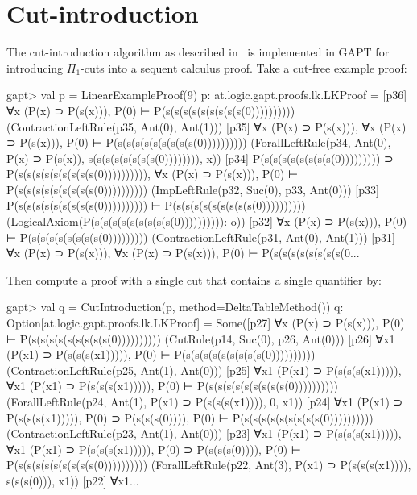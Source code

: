 \documentclass[a4paper,11pt]{book}
\begin{document}
\section{Cut-introduction}\label{sec.cut-introduction}

The cut-introduction algorithm as described in~\cite{Hetzl2012,Hetzl14Algorithmic,Hetzl14Introducing} is
implemented in GAPT for introducing $\Pi_1$-cuts into a sequent calculus
proof. Take a cut-free example proof:
\begin{clilisting}
gapt> val p = LinearExampleProof(9)
p: at.logic.gapt.proofs.lk.LKProof =
[p36] ∀x (P(x) ⊃ P(s(x))), P(0) ⊢ P(s(s(s(s(s(s(s(s(s(0))))))))))    (ContractionLeftRule(p35, Ant(0), Ant(1)))
[p35] ∀x (P(x) ⊃ P(s(x))), ∀x (P(x) ⊃ P(s(x))), P(0) ⊢ P(s(s(s(s(s(s(s(s(s(0))))))))))    (ForallLeftRule(p34, Ant(0), P(x) ⊃ P(s(x)), s(s(s(s(s(s(s(s(0)))))))), x))
[p34] P(s(s(s(s(s(s(s(s(0))))))))) ⊃ P(s(s(s(s(s(s(s(s(s(0)))))))))),
∀x (P(x) ⊃ P(s(x))),
P(0)
⊢
P(s(s(s(s(s(s(s(s(s(0))))))))))    (ImpLeftRule(p32, Suc(0), p33, Ant(0)))
[p33] P(s(s(s(s(s(s(s(s(s(0)))))))))) ⊢ P(s(s(s(s(s(s(s(s(s(0))))))))))    (LogicalAxiom(P(s(s(s(s(s(s(s(s(s(0)))))))))): o))
[p32] ∀x (P(x) ⊃ P(s(x))), P(0) ⊢ P(s(s(s(s(s(s(s(s(0)))))))))    (ContractionLeftRule(p31, Ant(0), Ant(1)))
[p31] ∀x (P(x) ⊃ P(s(x))), ∀x (P(x) ⊃ P(s(x))), P(0) ⊢ P(s(s(s(s(s(s(s(s(0...

\end{clilisting}
Then compute a proof with a single cut that contains a single quantifier by:
\begin{clilisting}
gapt> val q = CutIntroduction(p, method=DeltaTableMethod())
q: Option[at.logic.gapt.proofs.lk.LKProof] =
Some([p27] ∀x (P(x) ⊃ P(s(x))), P(0) ⊢ P(s(s(s(s(s(s(s(s(s(0))))))))))    (CutRule(p14, Suc(0), p26, Ant(0)))
[p26] ∀x1 (P(x1) ⊃ P(s(s(s(x1))))), P(0) ⊢ P(s(s(s(s(s(s(s(s(s(0))))))))))    (ContractionLeftRule(p25, Ant(1), Ant(0)))
[p25] ∀x1 (P(x1) ⊃ P(s(s(s(x1))))),
∀x1 (P(x1) ⊃ P(s(s(s(x1))))),
P(0)
⊢
P(s(s(s(s(s(s(s(s(s(0))))))))))    (ForallLeftRule(p24, Ant(1), P(x1) ⊃ P(s(s(s(x1)))), 0, x1))
[p24] ∀x1 (P(x1) ⊃ P(s(s(s(x1))))),
P(0) ⊃ P(s(s(s(0)))),
P(0)
⊢
P(s(s(s(s(s(s(s(s(s(0))))))))))    (ContractionLeftRule(p23, Ant(1), Ant(0)))
[p23] ∀x1 (P(x1) ⊃ P(s(s(s(x1))))),
∀x1 (P(x1) ⊃ P(s(s(s(x1))))),
P(0) ⊃ P(s(s(s(0)))),
P(0)
⊢
P(s(s(s(s(s(s(s(s(s(0))))))))))    (ForallLeftRule(p22, Ant(3), P(x1) ⊃ P(s(s(s(x1)))), s(s(s(0))), x1))
[p22] ∀x1...

\end{clilisting}
\end{document}
